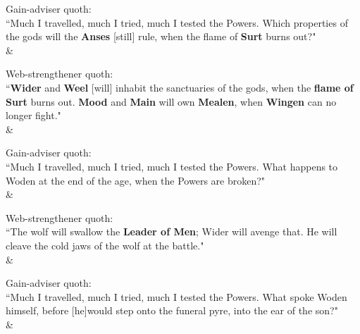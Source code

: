 \begin{Rightside}
\begin{astanza}%
\bv Gain-adviser quoth: \\ “Much I travelled, much I tried, much I tested the Powers. Which properties of the gods will the \textbf{Anses} [still] rule\footnotemark[105], when the flame of \textbf{Surt} burns out?" \\
\&\end{astanza}%

\begin{astanza}%
\bv Web-strengthener quoth: \\ “\textbf{Wider} and \textbf{Weel} [will] inhabit the sanctuaries of the gods, when the \textbf{flame of Surt} burns out. \textbf{Mood} and \textbf{Main} will own \textbf{Mealen}, when \textbf{Wingen} can no longer fight\footnotemark[110]." \\
\&\end{astanza}%

\begin{astanza}%
\bv Gain-adviser quoth: \\ “Much I travelled, much I tried, much I tested the Powers. What happens to Woden at the end of the age, when the Powers are broken?" \\
\&\end{astanza}%

\begin{astanza}%
\bv Web-strengthener quoth: \\ “The wolf will swallow the \textbf{Leader of Men}; Wider will avenge that. He will cleave the cold jaws of the wolf at the battle." \\
\&\end{astanza}%

\begin{astanza}%
\bv Gain-adviser quoth: \\ “Much I travelled, much I tried, much I tested the Powers. What spoke Woden himself, before [he]\footnotemark[115] would step onto the funeral pyre, into the ear of the son?" \\
\&\end{astanza}%


\end{Rightside}
